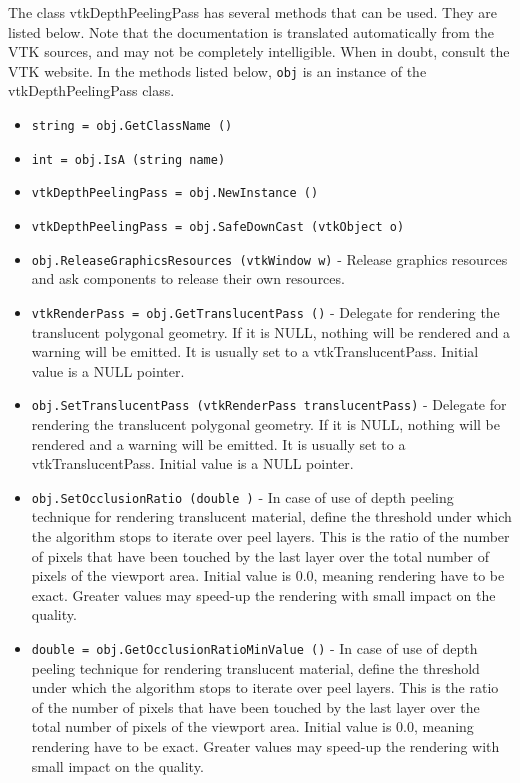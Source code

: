 The class vtkDepthPeelingPass has several methods that can be used.
  They are listed below.
Note that the documentation is translated automatically from the VTK sources,
and may not be completely intelligible.  When in doubt, consult the VTK website.
In the methods listed below, \verb|obj| is an instance of the vtkDepthPeelingPass class.
\begin{itemize}
\item  \verb|string = obj.GetClassName ()|

\item  \verb|int = obj.IsA (string name)|

\item  \verb|vtkDepthPeelingPass = obj.NewInstance ()|

\item  \verb|vtkDepthPeelingPass = obj.SafeDownCast (vtkObject o)|

\item  \verb|obj.ReleaseGraphicsResources (vtkWindow w)| -  Release graphics resources and ask components to release their own
 resources.
 

\item  \verb|vtkRenderPass = obj.GetTranslucentPass ()| -  Delegate for rendering the translucent polygonal geometry.
 If it is NULL, nothing will be rendered and a warning will be emitted.
 It is usually set to a vtkTranslucentPass.
 Initial value is a NULL pointer.

\item  \verb|obj.SetTranslucentPass (vtkRenderPass translucentPass)| -  Delegate for rendering the translucent polygonal geometry.
 If it is NULL, nothing will be rendered and a warning will be emitted.
 It is usually set to a vtkTranslucentPass.
 Initial value is a NULL pointer.

\item  \verb|obj.SetOcclusionRatio (double )| -  In case of use of depth peeling technique for rendering translucent
 material, define the threshold under which the algorithm stops to
 iterate over peel layers. This is the ratio of the number of pixels
 that have been touched by the last layer over the total number of pixels
 of the viewport area.
 Initial value is 0.0, meaning rendering have to be exact. Greater values
 may speed-up the rendering with small impact on the quality.

\item  \verb|double = obj.GetOcclusionRatioMinValue ()| -  In case of use of depth peeling technique for rendering translucent
 material, define the threshold under which the algorithm stops to
 iterate over peel layers. This is the ratio of the number of pixels
 that have been touched by the last layer over the total number of pixels
 of the viewport area.
 Initial value is 0.0, meaning rendering have to be exact. Greater values
 may speed-up the rendering with small impact on the quality.


\end{itemize}
